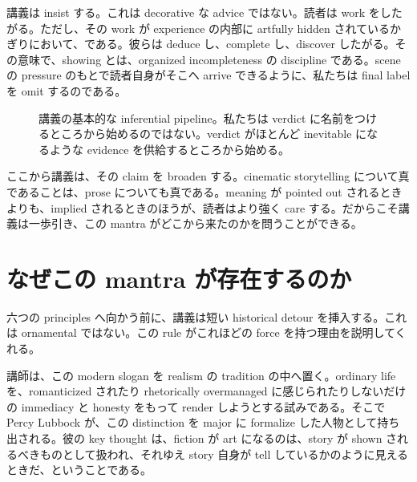 講義は insist する。これは decorative な advice ではない。読者は work をしたがる。ただし、その work が experience の内部に artfully hidden されているかぎりにおいて、である。彼らは deduce し、complete し、discover したがる。その意味で、showing とは、organized incompleteness の discipline である。scene の pressure のもとで読者自身がそこへ arrive できるように、私たちは final label を omit するのである。

\begin{figure}[h]
\centering
{}
\caption{講義の基本的な inferential pipeline。私たちは verdict に名前をつけるところから始めるのではない。verdict がほとんど inevitable になるような evidence を供給するところから始める。}
\end{figure}

ここから講義は、その claim を broaden する。cinematic storytelling について真であることは、prose についても真である。meaning が pointed out されるときよりも、implied されるときのほうが、読者はより強く care する。だからこそ講義は一歩引き、この mantra がどこから来たのかを問うことができる。

\section{なぜこの mantra が存在するのか}

六つの principles へ向かう前に、講義は短い historical detour を挿入する。これは ornamental ではない。この rule がこれほどの force を持つ理由を説明してくれる。

講師は、この modern slogan を realism の tradition の中へ置く。ordinary life を、romanticized されたり rhetorically overmanaged に感じられたりしないだけの immediacy と honesty をもって render しようとする試みである。そこで Percy Lubbock が、この distinction を major に formalize した人物として持ち出される。彼の key thought は、fiction が art になるのは、story が shown されるべきものとして扱われ、それゆえ story 自身が tell しているかのように見えるときだ、ということである。

